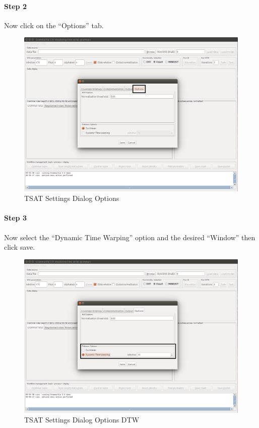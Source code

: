 \documentclass[letterpaper, 12pt]{article}
\begin{document}
\newpage
\paragraph{Step 2}
Now click on the ``Options'' tab.

\begin{figure}[H]
	\includegraphics[width=\textwidth]{TSAT-settings-dialog-options}
	\caption{TSAT Settings Dialog Options}
	\label{fig:TSAT-settings-dialog-options}
\end{figure}

\newpage
\paragraph{Step 3}
Now select the ``Dynamic Time Warping'' option and the desired ``Window'' then click save.

\begin{figure}[H]
	\includegraphics[width=\textwidth]{TSAT-settings-dialog-options-dtw}
	\caption{TSAT Settings Dialog Options DTW}
	\label{fig:TSAT-settings-dialog-options-dtw}
\end{figure}
\end{document}
